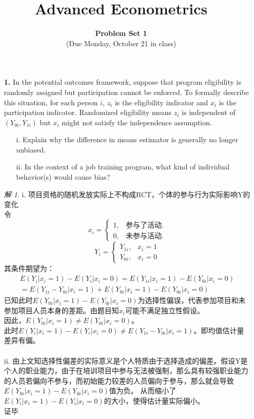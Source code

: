 \documentclass[a4paper]{ctexart}
\title{\textbf{Advanced Econometrics}}
\author{\textbf{Problem Set 1}\\(Due Monday, October 21 in class)}
\date{}
\theoremstyle{remark}
\newtheorem*{solution}{解}
\renewcommand{\qedsymbol}{证毕}
\begin{document}
\maketitle



\begin{itemize}
\item[\textbf{1.}] In the potential outcomes framework, suppose that program eligibility is randomly assigned but participation cannot be enforced. To formally describe this situation, for each person $i$, $z_i$ is the eligibility indicator and $x_i$ is the participation indicator. Randomized eligibility means $z_i$ is independent of $(Y_{0i}, Y_{1i})$ but $x_i$ might not satisfy the independence assumption.
\begin{enumerate}
\item[i.] Explain why the difference in means estimator is generally no longer unbiased.
\item[ii.] In the context of a job training program, what kind of individual behavior(s) would cause bias?
\end{enumerate}

\begin{solution}
    i. 项目资格的随机发放实际上不构成RCT，个体的参与行为实际影响Y的变化\\
    令
    \begin{equation*} 
        x_i = 
        \begin{cases}
            1, &\text{参与了活动.} \\
            0, &\text{未参与活动.}
        \end{cases}
    \end{equation*}
    \begin{equation*}
        Y_i = 
        \begin{cases}
            Y_{1i}, &{x_i = 1} \\
            Y_{0i}, &{x_i = 0}
        \end{cases} 
    \end{equation*}
    其条件期望为：
    \begin{align*}
        E(Y_i|x_i=1) - E(Y_i|x_i=0) = E(Y_{1i}|x_i=1)-E(Y_{0i}|x_i=0)\\
        =E(Y_{1i}-Y_{0i}|x_i=1)+E(Y_{0i}|x_i=1)-E(Y_{0i}|x_i=0)
    \end{align*}
    已知此时$E(Y_{0i}|x_i=1)-E(Y_{0i}|x_i=0)$为选择性偏误，代表参加项目和未参加项目人员本身的差距。由题目知$x_i$可能不满足独立性假设。\\
    因此，$E(Y_{0i}|x_i=1)\neq E(Y_{0i}|x_i=0)$。\\
    此时$E(Y_i|x_i=1) - E(Y_i|x_i=0) \neq E(Y_{1i}-Y_{0i}|x_i=1)$。即均值估计量差异有偏。\\
    \\
    ii. 由上文知选择性偏差的实际意义是个人特质由于选择造成的偏差。假设Y是个人的职业能力，由于在培训项目中参与无法被强制，那么具有较强职业能力的人员若偏向不参与，而初始能力较差的人员偏向于参与，那么就会导致$E(Y_{0i}|x_i=1)-E(Y_{0i}|x_i=0)$值为负。
    从而缩小了$E(Y_i|x_i=1) - E(Y_i|x_i=0)$的大小，使得估计量实际偏小。
    \\
    \qedsymbol
\end{solution}


\end{itemize}
\end{document}
